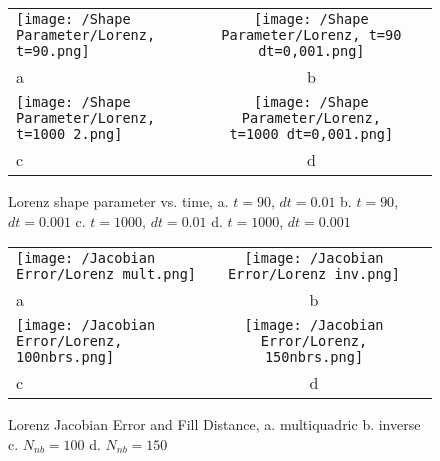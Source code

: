             \begin{figure}[H]
                \centering
                \begin{tabular}{lcc}
                    \texttt{[image: /Shape Parameter/Lorenz, t=90.png]}&
                    \texttt{[image: /Shape Parameter/Lorenz, t=90 dt=0,001.png]}\\
                    \hfil a &b\\
                    \texttt{[image: /Shape Parameter/Lorenz, t=1000 2.png]}&
                    \texttt{[image: /Shape Parameter/Lorenz, t=1000 dt=0,001.png]}\\
                    \hfil c &d\\
                \end{tabular}
                \caption{Lorenz shape parameter vs. time, a. $t=90$, $dt=0.01$ b. $t=90$, $dt=0.001$ c. $t=1000$, $dt=0.01$ d. $t=1000$, $dt=0.001$}\label{fig:lorenzshape}
            \end{figure}
            \begin{figure}[H]
                \centering
                \begin{tabular}{lcc}
                    \texttt{[image: /Jacobian Error/Lorenz mult.png]}&
                    \texttt{[image: /Jacobian Error/Lorenz inv.png]}\\
                    \hfil a &b\\
                    \texttt{[image: /Jacobian Error/Lorenz, 100nbrs.png]}&
                    \texttt{[image: /Jacobian Error/Lorenz, 150nbrs.png]}\\
                    \hfil c &d\\
                \end{tabular}
                \caption{Lorenz Jacobian Error and Fill Distance, a. multiquadric b. inverse c. $N_{nb}=100$ d. $N_{nb}=150$}\label{fig:lorenzjac3}
            \end{figure}

